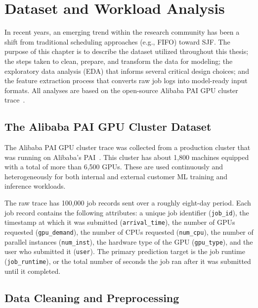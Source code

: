 \chapter{Dataset and Workload Analysis}\label{chp:dataset}

In recent years, an emerging trend within the research community has been a shift from traditional scheduling approaches (e.g., FIFO) toward SJF. The purpose of this chapter is to describe the dataset utilized throughout this thesis; the steps taken to clean, prepare, and transform the data for modeling; the exploratory data analysis (EDA) that informs several critical design choices; and the feature extraction process that converts raw job logs into model-ready input formats. All analyses are based on the open-source Alibaba PAI GPU cluster trace~\cite{weng2022mlaas}.

\section{The Alibaba PAI GPU Cluster Dataset}

The Alibaba PAI GPU cluster trace was collected from a production cluster that was running on Alibaba's PAI~\cite{weng2022mlaas}. This cluster has about 1,800 machines equipped with a total of more than 6,500 GPUs. These are used continuously and heterogeneously for both internal and external customer ML training and inference workloads.

The raw trace has 100,000 job records sent over a roughly eight-day period. Each job record contains the following attributes: a unique job identifier (\texttt{job\_id}), the timestamp at which it was submitted (\texttt{arrival\_time}), the number of GPUs requested (\texttt{gpu\_demand}), the number of CPUs requested (\texttt{num\_cpu}), the number of parallel instances (\texttt{num\_inst}), the hardware type of the GPU (\texttt{gpu\_type}), and the user who submitted it (\texttt{user}). The primary prediction target is the job runtime (\texttt{job\_runtime}), or the total number of seconds the job ran after it was submitted until it completed.

\section{Data Cleaning and Preprocessing}

